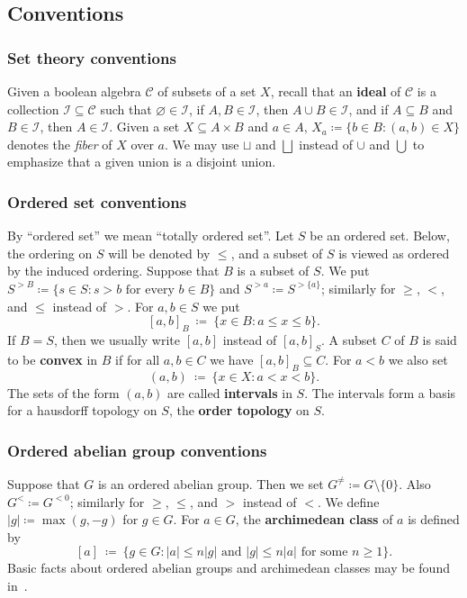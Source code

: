 \documentclass[11pt]{amsart}
\theoremstyle{plain}
\theoremstyle{definition}
\numberwithin{equation}{section}
\newcommand\0{\varnothing}
\begin{document}
\subsection{Conventions}

\subsubsection*{Set theory conventions}
Given a boolean algebra $\mathcal{C}$ of subsets of a set $X$, recall that an \textbf{ideal} of $\mathcal{C}$ is a collection $\mathcal{I}\subseteq\mathcal{C}$ such that $\varnothing\in\mathcal{I}$, if $A,B\in\mathcal{I}$, then $A\cup B\in\mathcal{I}$, and if $A\subseteq B$ and $B\in\mathcal{I}$, then $A\in\mathcal{I}$.
Given a set $X\subseteq A\times B$ and $a\in A$, $X_a\coloneqq\{b\in B:(a,b)\in X\}$ denotes the \emph{fiber} of $X$ over $a$. We may use $\sqcup$ and $\bigsqcup$ instead of $\cup$ and $\bigcup$ to emphasize that a given union is a disjoint union.

\subsubsection*{Ordered set conventions} By ``ordered set'' we mean ``totally ordered set''. 
Let $S$ be an ordered set. Below, the ordering on $S$ will be denoted by $\leq$, and a subset of $S$ is viewed as ordered by the induced ordering. 
Suppose that $B$ is a subset of $S$. We put $S^{>B}\coloneqq\{s\in S:\text{$s>b$ for every $b\in B$}\}$ and $S^{>a} \coloneqq S^{>\{a\}}$; similarly for $\geq$, $<$, and $\leq$ instead of $>$.
For $a,b\in S$ we put
\[
[a,b]_B \ \coloneqq \ \{x\in B:a\leq x\leq b\}.
\]
If $B=S$, then we usually write $[a,b]$ instead of $[a,b]_S$. A subset $C$ of $B$ is said to be \textbf{convex} in $B$ if for all $a,b\in C$ we have $[a,b]_B\subseteq C$. For $a<b$ we also set
\[
(a,b) \ \coloneqq \ \{x\in X:a<x<b\}.
\]
The sets of the form $(a,b)$ are called \textbf{intervals} in $S$. The intervals form a basis for a hausdorff topology on $S$, the \textbf{order topology} on $S$.

\subsubsection*{Ordered abelian group conventions} Suppose that $G$ is an ordered abelian group. Then we set $G^{\neq}\coloneqq G\setminus\{0\}$. Also $G^{<}\coloneqq G^{<0}$; similarly for $\geq$, $\leq$, and $>$ instead of $<$. We define $|g|\coloneqq\max(g,-g)$ for $g\in G$. For $a\in G$, the \textbf{archimedean class} of $a$ is defined by
\[
[a] \ \coloneqq \ \{g\in G:\text{$|a|\leq n|g|$ and $|g|\leq n|a|$ for some $n\geq 1$}\}.
\]
Basic facts about ordered abelian groups and archimedean classes may be found in~\cite[2.4]{ADAMTT}.
\end{document}
